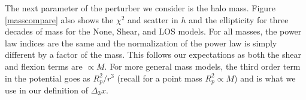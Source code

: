 The next parameter of the perturber we consider is the halo mass. Figure \ref{masscompare} also shows the $\chi^2$ and scatter in $h$ and the ellipticity for three decades of mass for the None, Shear, and LOS models. For all masses, the power law indices are the same and the normalization of the power law is simply different by a factor of the mass. This follows our expectations as both the shear and flexion terms are $\propto M$. For more general mass models, the third order term in the potential goes as $R_p^2/r^3$ (recall for a point mass $R_p^2 \propto M$) and is what we use in our definition of $\Delta_3 x$.